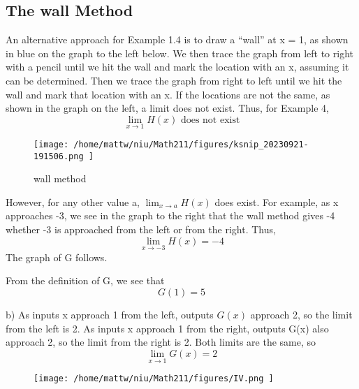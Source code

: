 \documentclass{report}
\begin{document}
\subsection{The wall Method}
\bigbreak \noindent
An alternative approach for Example 1.4 is to draw a ``wall'' at x = 1, as shown in blue on the graph to the left below. We then trace the graph from left to right with a pencil until we hit the wall and mark the location with an x, assuming it can be determined. Then we trace the graph from right to left until we hit the wall and mark that location with an x. If the locations are not the same, as shown in the graph on the left, a limit does not exist. Thus, for Example 4,
$$\displaystyle\lim_{x\to 1}H(x) \text{ does not exist} $$
\pagebreak
\begin{figure}[ht]
\centering
\texttt{[image:  /home/mattw/niu/Math211/figures/ksnip\_20230921-191506.png ]}
\caption*{wall method}
\end{figure}
\bigbreak \noindent
However, for any other value a, $\displaystyle\lim_{x\to a }H(x)$ does exist. For example, as x approaches -3, we see in the graph to the right that the wall method gives -4 whether -3 is approached from the left or from the right. Thus,
$$\displaystyle\lim_{x\to -3 }H(x) = -4$$
\bigbreak \noindent
{}
\sol{}
\bigbreak \noindent
The graph of G follows.
\begin{figure}[ht]
    \centering
\end{figure}
\bigbreak \noindent
From the definition of G, we see that
$$G(1) = 5$$
\pagebreak

\noindent b) As inputs x approach 1 from the left, outputs $G(x)$ approach 2, so the limit from the left is 2. As inputs x approach 1 from the right, outputs G(x) also approach 2, so the limit from the right is 2. Both limits are the same, so
$$\displaystyle\lim_{x\to 1}G(x) = 2$$
\bigbreak \noindent
{}
\begin{figure}[ht]
\centering
\texttt{[image:  /home/mattw/niu/Math211/figures/IV.png ]}
\end{figure}
\bigbreak \noindent \bigbreak \noindent
\end{document}
